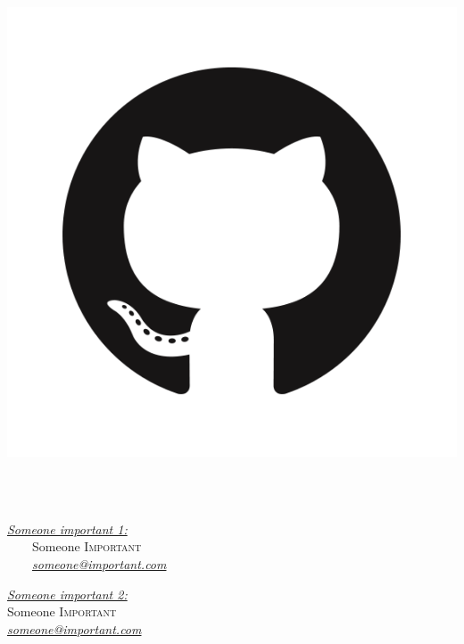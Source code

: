 \begin{titlepage}
\begin{center}
\begin{minipage}{.4\textwidth}
\begin{flushright}
            \includegraphics[width=\textwidth]{./img/GitHub.png}
        \end{flushright}
    \end{minipage}~\\[1cm]

    \textsc{\Large }\\[2.7cm]

    \begin{minipage}{0.4\textwidth}
        \begin{flushleft} \large
            \emph{\underline{Someone important 1:}} \\\vspace*{.25em}
            ~~~~Someone \textsc{Important}\\
            ~~~~\href{mailto:someone@important.com}{\emph{someone@important.com}}
        \end{flushleft}
    \end{minipage}
    \begin{minipage}{0.4\textwidth}
        \begin{flushright} \large
            \emph{\underline{Someone important 2:}~~~~~~~~~~~~} \\\vspace*{.25em}
            Someone \textsc{Important}~~~~~~~~\\
            \href{mailto:someone@important.com}{\emph{someone@important.com}}
        \end{flushright}
    \end{minipage}


\end{center}
\end{titlepage}
